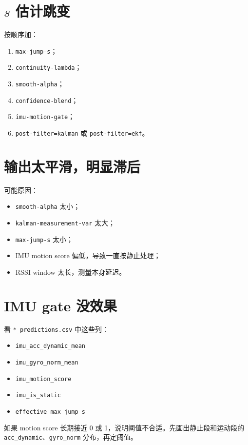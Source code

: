 \documentclass[11pt,a4paper,openany]{report}
\newcommand{\file}[1]{\nolinkurl{#1}}
\newcommand{\param}[1]{\nolinkurl{#1}}
\newcommand{\csvcol}[1]{\nolinkurl{#1}}
\begin{document}
\section{\(s\) 估计跳变}

按顺序加：

\begin{enumerate}
  \item \param{max-jump-s}；
  \item \param{continuity-lambda}；
  \item \param{smooth-alpha}；
  \item \param{confidence-blend}；
  \item \param{imu-motion-gate}；
  \item \param{post-filter=kalman} 或 \param{post-filter=ekf}。
\end{enumerate}

\section{输出太平滑，明显滞后}

可能原因：

\begin{itemize}
  \item \param{smooth-alpha} 太小；
  \item \param{kalman-measurement-var} 太大；
  \item \param{max-jump-s} 太小；
  \item IMU motion score 偏低，导致一直按静止处理；
  \item RSSI window 太长，测量本身延迟。
\end{itemize}

\section{IMU gate 没效果}

看 \file{*_predictions.csv} 中这些列：

\begin{itemize}
  \item \csvcol{imu_acc_dynamic_mean}
  \item \csvcol{imu_gyro_norm_mean}
  \item \csvcol{imu_motion_score}
  \item \csvcol{imu_is_static}
  \item \csvcol{effective_max_jump_s}
\end{itemize}

如果 motion score 长期接近 0 或 1，说明阈值不合适。先画出静止段和运动段的 \csvcol{acc_dynamic}、\csvcol{gyro_norm} 分布，再定阈值。
\end{document}
